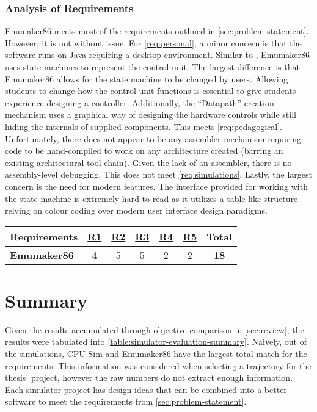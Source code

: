 \subsubsection*{Analysis of Requirements}

Enumaker86 meets most of the requirements outlined in \cref{sec:problem-statement}. However, it is not without issue. For \cref{req:personal}, a minor concern is that the software runs on Java requiring a desktop environment. Similar to \cite{McLoughlin2010,Nakamura2013}, Emumaker86 uses state machines to represent the control unit. The largest difference is that Emumaker86 allows for the state machine to be changed by users. Allowing students to change how the control unit functions is essential to give students experience designing a controller. Additionally, the ``Datapath'' creation mechanism uses a graphical way of designing the hardware controls while still hiding the internals of supplied components. This meets \cref{req:pedagogical}. Unfortunately, there does not appear to be any assembler mechanism requiring code to be hand-compiled to work on any architecture created (barring an existing architectural tool chain). Given the lack of an assembler, there is no assembly-level debugging. This does not meet \cref{req:simulations}. Lastly, the largest concern is the need for modern features. The interface provided for working with the state machine is extremely hard to read as it utilizes a table-like structure relying on colour coding over modern user interface design paradigms.

\begin{table}[h!]
    \centering
    \begin{tabular}{lcccccc}
        \textbf{Requirements} & \textbf{\hyperref[req:personal]{R1}} & \textbf{\hyperref[req:configuration]{R2}} & \textbf{\hyperref[req:pedagogical]{R3}} & \textbf{\hyperref[req:simulations]{R4}} & \textbf{\hyperref[req:modern]{R5}} & \textbf{Total} \\ \hline
        \textbf{Emumaker86 \cite{Black2013}}
        & 4 & 5 & 5 & 2 & 2 & \textbf{18} \\ 
    \end{tabular}
\end{table}

\section{Summary}

Given the results accumulated through objective comparison in \cref{sec:review}, the results were tabulated into \cref{table:simulator-evaluation-summary}. Naively, out of the simulations, CPU Sim \cite{Skrien2001,Skrien2017} and Emumaker86 \cite{Black2013} have the largest total match for the requirements. This information was considered when selecting a trajectory for the thesis' project, however the raw numbers do not extract enough information. Each simulator project has design ideas that can be combined into a better software to meet the requirements from \cref{sec:problem-statement}. 

